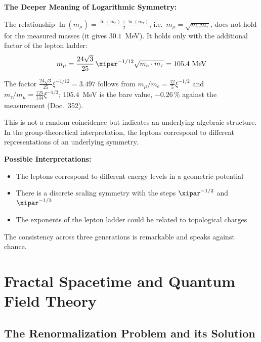 	\begin{treatise}
		\textbf{The Deeper Meaning of Logarithmic Symmetry:}
		
		The relationship $\ln(m_\mu) = \frac{\ln(m_e) + \ln(m_\tau)}{2}$, i.e.\ $m_\mu = \sqrt{m_e m_\tau}$, does not hold for the measured masses (it gives $30.1$~MeV). It holds only with the additional factor of the lepton ladder:
		\begin{equation}
			m_\mu = \frac{24\sqrt{3}}{25}\,\xipar^{-1/12}\sqrt{m_e \cdot m_\tau} = 105.4\ \text{MeV}
		\end{equation}

		The factor $\frac{24\sqrt3}{25}\xi^{-1/12} = 3.497$ follows from $m_\mu/m_e = \frac{12}{5}\xi^{-1/2}$ and $m_\tau/m_\mu = \frac{125}{144}\xi^{-1/3}$; $105.4$~MeV is the bare value, $-0.26\,\%$ against the measurement (Doc.~352).
		
		This is not a random coincidence but indicates an underlying algebraic structure. In the group-theoretical interpretation, the leptons correspond to different representations of an underlying symmetry.
		
		\textbf{Possible Interpretations:}
		\begin{itemize}
			\item The leptons correspond to different energy levels in a geometric potential
			\item There is a discrete scaling symmetry with the steps $\xipar^{-1/2}$ and $\xipar^{-1/3}$
			\item The exponents of the lepton ladder could be related to topological charges
		\end{itemize}
		
		The consistency across three generations is remarkable and speaks against chance.
	\end{treatise}
	
	\section{Fractal Spacetime and Quantum Field Theory}
	
	\subsection{The Renormalization Problem and its Solution}
	
